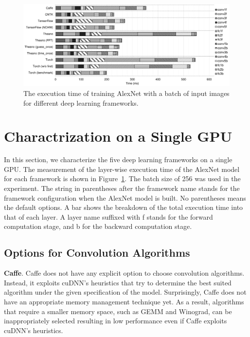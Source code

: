 \begin{figure}[htbp]
  \centering
  \includegraphics[width=\linewidth]{./figures/time_frameworks}
  \caption{%
The execution time of training AlexNet with a batch of input images for different deep learning frameworks. 
\label{fig_time_frameworks}
  }
\end{figure}


\section{Charactrization on a Single GPU}
\label{sec:singlGPU}
In this section, we characterize the five deep learning frameworks on a single GPU. The measurement of the layer-wise execution time of the AlexNet model for each framework is shown in Figure~\ref{fig_time_frameworks}. The batch size of 256 was used in the experiment. The string in parentheses after the framework name stands for the framework configuration when the AlexNet model is built. No parentheses means the default options. A bar shows the breakdown of the total execution time into that of each layer. A layer name suffixed with \textsf{f} stands for the forward computation stage, and \textsf{b} for the backward computation stage.

\subsection{Options for Convolution Algorithms}
{\bf Caffe}. Caffe does not have any explicit option to choose convolution algorithms. Instead, it exploits cuDNN's heuristics that try to determine the best suited algorithm under the given specification of the model. Surprisingly, Caffe does not have an appropriate memory management technique yet. As a result, algorithms that require a smaller memory space, such as GEMM and Winograd, can be inappropriately selected resulting in low performance even if Caffe exploits cuDNN's heuristics. 

